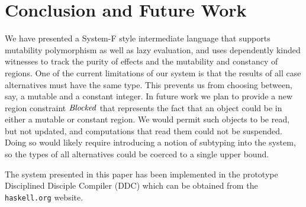 
\vspace{-0.25em}
\section{Conclusion and Future Work}
\label{conclusion}
We have presented a System-F style intermediate language that supports mutability polymorphism as well as lazy evaluation, and uses dependently kinded witnesses to track the purity of effects and the mutability and constancy of regions. One of the current limitations of our system is that the results of all case alternatives must have the same type. This prevents us from choosing between, say, a mutable and a constant integer. In future work we plan to provide a new region constraint $\operatorname{\mathit{Blocked}}$ that represents the fact that an object could be in either a mutable or constant region. We would permit such objects to be read, but not updated, and computations that read them could not be suspended. Doing so would likely require introducing a notion of subtyping into the system, so the types of all alternatives could be coerced to a single upper bound. 

The system presented in this paper has been implemented in the prototype Disciplined Disciple Compiler (DDC) which can be obtained from the \texttt{haskell.org} website. 